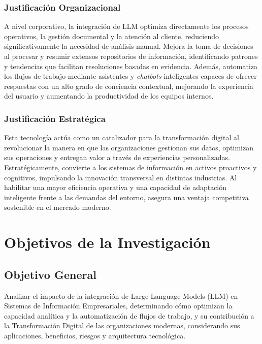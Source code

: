 \documentclass[12pt,a4paper,oneside]{article}
\begin{document}
\subsubsection{Justificación Organizacional}

A nivel corporativo, la integración de LLM optimiza directamente los procesos operativos, la gestión documental y la atención al cliente, reduciendo significativamente la necesidad de análisis manual. Mejora la toma de decisiones al procesar y resumir extensos repositorios de información, identificando patrones y tendencias que facilitan resoluciones basadas en evidencia. Además, automatiza los flujos de trabajo mediante asistentes y \textit{chatbots} inteligentes capaces de ofrecer respuestas con un alto grado de conciencia contextual, mejorando la experiencia del usuario y aumentando la productividad de los equipos internos.

\subsubsection{Justificación Estratégica}

Esta tecnología actúa como un catalizador para la transformación digital al revolucionar la manera en que las organizaciones gestionan sus datos, optimizan sus operaciones y entregan valor a través de experiencias personalizadas. Estratégicamente, convierte a los sistemas de información en activos proactivos y cognitivos, impulsando la innovación transversal en distintas industrias. Al habilitar una mayor eficiencia operativa y una capacidad de adaptación inteligente frente a las demandas del entorno, asegura una ventaja competitiva sostenible en el mercado moderno.

\section{Objetivos de la Investigación}

\subsection{Objetivo General}

Analizar el impacto de la integración de Large Language Models (LLM) en Sistemas de Información Empresariales, determinando cómo optimizan la capacidad analítica y la automatización de flujos de trabajo, y su contribución a la Transformación Digital de las organizaciones modernas, considerando sus aplicaciones, beneficios, riesgos y arquitectura tecnológica.
\end{document}
